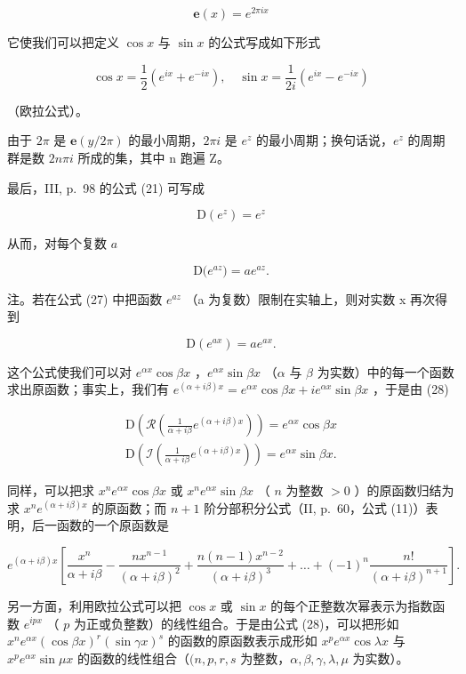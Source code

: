 \[
\mathbf {e} (x) = e ^ {2 \pi i x}\tag{24}
\]

它使我们可以把定义 \(\cos x\) 与 \(\sin x\) 的公式写成如下形式

\[
\cos x = \frac {1}{2} \left(e ^ {i x} + e ^ {- i x}\right), \quad \sin x = \frac {1}{2 i} \left(e ^ {i x} - e ^ {- i x}\right)\tag{25}
\]

（欧拉公式）。

由于 \(2\pi\) 是 \(\mathbf{e}(y/2\pi)\) 的最小周期，\(2\pi i\) 是 \(e^{z}\) 的最小周期；换句话说，\(e^{z}\) 的周期群是数 \(2n\pi i\) 所成的集，其中 n 跑遍 Z。

最后，III, p.~98 的公式 (21) 可写成

\[
\mathrm{D} \left(e ^ {z}\right) = e ^ {z}\tag{26}
\]

从而，对每个复数 \(a\)

\[
\mathrm{D} \big (e ^ {a z} \big) = a e ^ {a z}.\tag{27}
\]

注。若在公式 (27) 中把函数 \(e^{az}\) （a 为复数）限制在实轴上，则对实数 x 再次得到

\[
\mathrm{D} (e ^ {a x}) = a e ^ {a x}.\tag{28}
\]

这个公式使我们可以对 \(e^{\alpha x} \cos \beta x\) ，\(e^{\alpha x} \sin \beta x\) （\(\alpha\) 与 \(\beta\) 为实数）中的每一个函数求出原函数；事实上，我们有 \(e^{(\alpha + i\beta)x} = e^{\alpha x} \cos \beta x + ie^{\alpha x} \sin \beta x\) ，于是由 (28)

\[
\begin{array}{l} \mathrm{D} \left(\mathcal {R} \left(\frac {1}{\alpha + i \beta} e ^ {(\alpha + i \beta) x}\right)\right) = e ^ {\alpha x} \cos \beta x \\ \mathrm{D} \left(\mathcal {I} \left(\frac {1}{\alpha + i \beta} e ^ {(\alpha + i \beta) x}\right)\right) = e ^ {\alpha x} \sin \beta x. \end{array}
\]

同样，可以把求 \(x^n e^{\alpha x} \cos \beta x\) 或 \(x^n e^{\alpha x} \sin \beta x\) （ \(n\) 为整数 \(> 0\) ）的原函数归结为求 \(x^n e^{(\alpha + i\beta)x}\) 的原函数；而 \(n + 1\) 阶分部积分公式（II, p.~60，公式 (11)）表明，后一函数的一个原函数是

\[
e ^ {(\alpha + i \beta) x} \left[ \frac {x ^ {n}}{\alpha + i \beta} - \frac {n x ^ {n - 1}}{(\alpha + i \beta) ^ {2}} + \frac {n (n - 1) x ^ {n - 2}}{(\alpha + i \beta) ^ {3}} + \dots + (- 1) ^ {n} \frac {n !}{(\alpha + i \beta) ^ {n + 1}} \right].
\]

另一方面，利用欧拉公式可以把 \(\cos x\) 或 \(\sin x\) 的每个正整数次幂表示为指数函数 \(e^{ipx}\) （ \(p\) 为正或负整数）的线性组合。于是由公式 (28)，可以把形如 \(x^n e^{\alpha x}(\cos \beta x)^r (\sin \gamma x)^s\) 的函数的原函数表示成形如 \(x^p e^{\alpha x}\cos \lambda x\) 与 \(x^p e^{\alpha x}\sin \mu x\) 的函数的线性组合（\((n, p, r, s\) 为整数，\(\alpha, \beta, \gamma, \lambda, \mu\) 为实数）。

